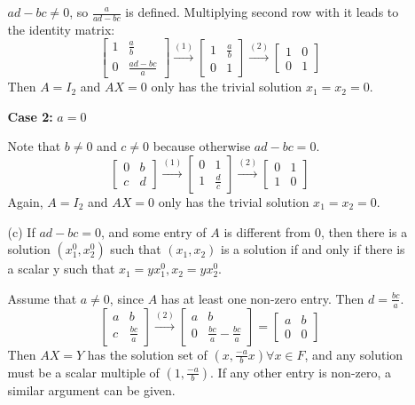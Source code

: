 \documentclass{article}
\begin{document}
\begin{enumerate}[listparindent=\parindent]
\begin{enumerate}[listparindent=\parindent]
\(ad - bc \neq 0\), so \( \frac{a}{ad - bc} \) is defined. Multiplying second row with it leads to the identity matrix:
\[
    \begin{bmatrix}
        1 & \frac{a}{b} \\
        0 & \frac{ad - bc}{a}
    \end{bmatrix}
    \xrightarrow{(1)}
    \begin{bmatrix}
        1 & \frac{a}{b} \\
        0 & 1
    \end{bmatrix}
    \xrightarrow{(2)}
    \begin{bmatrix}
        1 & 0 \\
        0 & 1
    \end{bmatrix}
\]
Then \(A = I_2\) and \(AX = 0\) only has the trivial solution \(x_1 = x_2 = 0\).

\textbf{Case 2:} \(a = 0\)

Note that \(b \neq 0\) and \(c \neq 0\) because otherwise \(ad - bc = 0\).
\[
    \begin{bmatrix}
        0 & b \\
        c & d
    \end{bmatrix}
    \xrightarrow{(1)}
    \begin{bmatrix}
        0 & 1 \\
        1 & \frac{d}{c}
    \end{bmatrix}
    \xrightarrow{(2)}
    \begin{bmatrix}
        0 & 1 \\
        1 & 0
    \end{bmatrix}
\]
Again, \(A = I_2\) and \(AX = 0\) only has the trivial solution \(x_1 = x_2 = 0\).

\item[(c)] If \(ad - bc = 0\), and some entry of \(A\) is different from 0, then there is a solution
    \( (x_1^0, x_2^0) \) such that \( (x_1, x_2) \) is a solution if and only if there is a scalar y such that
    \( x_1 = yx_1^0, x_2 = yx_2^0 \).

Assume that \(a \neq 0\), since \(A\) has at least one non-zero entry. Then \(d = \frac{bc}{a}\).
\[
    \begin{bmatrix}
        a & b \\
        c & \frac{bc}{a}
    \end{bmatrix}
    \xrightarrow{(2)}
    \begin{bmatrix}
        a & b \\
        0 & \frac{bc}{a} - \frac{bc}{a}
    \end{bmatrix}
    =
    \begin{bmatrix}
        a & b \\
        0 & 0
    \end{bmatrix}
\]
Then \(AX = Y\) has the solution set of \( (x, \frac{-a}{b}x) \forall x \in F \),
and any solution must be a scalar multiple of \( (1, \frac{-a}{b}) \).
If any other entry is non-zero, a similar argument can be given.
\end{enumerate}
\end{enumerate}
\end{document}
